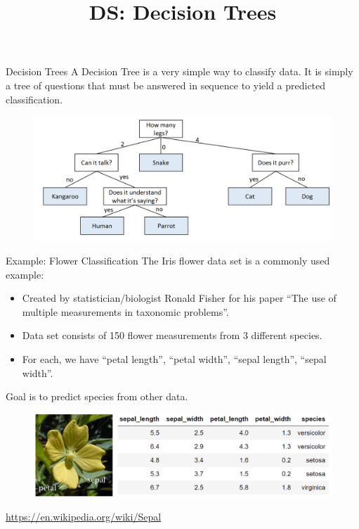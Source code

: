 \documentclass[aspectratio=169]{../latex_main/tntbeamer}  %
\title[Introduction]{DS: Decision Trees}
\subtitle{}
\begin{document}
	
	\maketitle
	\begin{frame}{Decision Trees}
	    A Decision Tree is a very simple way to classify data. It is simply a tree of questions that must be answered in sequence to yield a predicted classification.
	    \begin{figure}
	        \centering
	        \includegraphics[scale=.35]{Bild1}
	    \end{figure}
	\end{frame}
	
	
	\begin{frame}{Example: Flower Classification}
	    The Iris flower data set is a commonly used example:
	    \begin{itemize}
	        \item Created by statistician/biologist Ronald Fisher for his paper “The use of multiple measurements in taxonomic problems”.
	        \item Data set consists of 150 flower measurements from 3 different species.
	        \item For each, we have “petal length”, “petal width”, “sepal length”, “sepal width”.
	    \end{itemize}
	    Goal is to predict species from other data.
	    \begin{figure}
	        \centering
	        \includegraphics[scale=.35]{Bild2}
	    \end{figure}
	    \url{https://en.wikipedia.org/wiki/Sepal}

	\end{frame}
	
\end{document}
